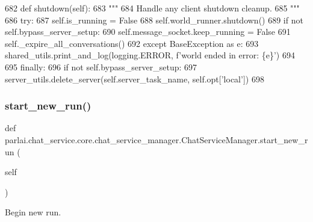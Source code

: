 \begin{DoxyCode}
682     \textcolor{keyword}{def }shutdown(self):
683         \textcolor{stringliteral}{"""}
684 \textcolor{stringliteral}{        Handle any client shutdown cleanup.}
685 \textcolor{stringliteral}{        """}
686         \textcolor{keywordflow}{try}:
687             self.is\_running = \textcolor{keyword}{False}
688             self.world\_runner.shutdown()
689             \textcolor{keywordflow}{if} \textcolor{keywordflow}{not} self.bypass\_server\_setup:
690                 self.message\_socket.keep\_running = \textcolor{keyword}{False}
691             self.\_expire\_all\_conversations()
692         \textcolor{keywordflow}{except} BaseException \textcolor{keyword}{as} e:
693             shared\_utils.print\_and\_log(logging.ERROR, f\textcolor{stringliteral}{'world ended in error: \{e\}'})
694 
695         \textcolor{keywordflow}{finally}:
696             \textcolor{keywordflow}{if} \textcolor{keywordflow}{not} self.bypass\_server\_setup:
697                 server\_utils.delete\_server(self.server\_task\_name, self.opt[\textcolor{stringliteral}{'local'}])
698 
\end{DoxyCode}
\mbox{\label{classparlai_1_1chat__service_1_1core_1_1chat__service__manager_1_1ChatServiceManager_a1a41f5cd5f08e44605cb73fbb6b7e310}} 
\subsubsection{\texorpdfstring{start\+\_\+new\+\_\+run()}{start\_new\_run()}}
{\footnotesize\ttfamily def parlai.\+chat\+\_\+service.\+core.\+chat\+\_\+service\+\_\+manager.\+Chat\+Service\+Manager.\+start\+\_\+new\+\_\+run (\begin{DoxyParamCaption}\item[{}]{self }\end{DoxyParamCaption})}

\begin{DoxyVerb}Begin new run.
\end{DoxyVerb}
 

